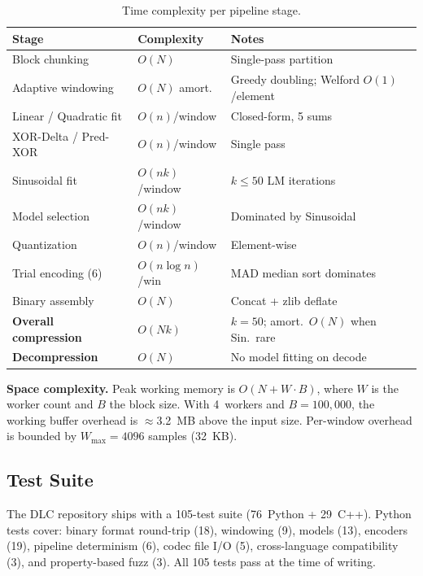 \documentclass[runningheads]{llncs}
\begin{document}
\begin{table}[t]
\centering
\caption{Time complexity per pipeline stage.}
\label{tab:timecomplexity}
\small
\begin{tabular}{llp{6cm}}
\toprule
\textbf{Stage} & \textbf{Complexity} & \textbf{Notes} \\
\midrule
Block chunking & $O(N)$ & Single-pass partition \\
Adaptive windowing & $O(N)$ amort. & Greedy doubling; Welford $O(1)$/element \\
Linear / Quadratic fit & $O(n)$/window & Closed-form, 5 sums \\
XOR-Delta / Pred-XOR & $O(n)$/window & Single pass \\
Sinusoidal fit & $O(nk)$/window & $k \le 50$ LM iterations \\
Model selection & $O(nk)$/window & Dominated by Sinusoidal \\
Quantization & $O(n)$/window & Element-wise \\
Trial encoding (6) & $O(n\log n)$/win & MAD median sort dominates \\
Binary assembly & $O(N)$ & Concat + zlib deflate \\
\midrule
\textbf{Overall compression} & $O(Nk)$ & $k{=}50$; amort.\ $O(N)$ when Sin.\ rare \\
\textbf{Decompression} & $O(N)$ & No model fitting on decode \\
\bottomrule
\end{tabular}
\end{table}

\textbf{Space complexity.} Peak working memory is $O(N + W \cdot B)$, where $W$ is the worker count and $B$ the block size. With 4~workers and $B = 100{,}000$, the working buffer overhead is $\approx$3.2~MB above the input size. Per-window overhead is bounded by $W_{\max} = 4096$ samples (32~KB).

\subsection{Test Suite}

The DLC repository ships with a 105-test suite (76~Python + 29~C++). Python tests cover: binary format round-trip (18), windowing (9), models (13), encoders (19), pipeline determinism (6), codec file I/O (5), cross-language compatibility (3), and property-based fuzz (3). All 105 tests pass at the time of writing.


\end{document}
